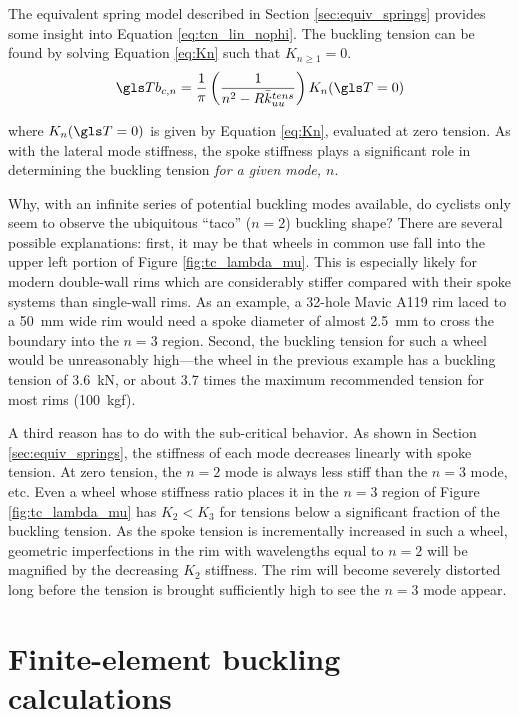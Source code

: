 \documentclass[\rootdir/thesis.tex]{subfiles}
\begin{document}
The equivalent spring model described in Section \ref{sec:equiv_springs} provides some insight into Equation \eqref{eq:tcn_lin_nophi}. The buckling tension can be found by solving Equation \eqref{eq:Kn} such that $K_{n\geq 1} = 0$.
\begin{equation}
\Tb_{c,n} = \frac{1}{\pi}\left(\frac{1}{n^2 - R\kuu^{tens}}\right) K_n(\T=0)
\end{equation}

where $K_n(\T=0)$ is given by Equation \eqref{eq:Kn}, evaluated at zero tension. As with the lateral mode stiffness, the spoke stiffness plays a significant role in determining the buckling tension \emph{for a given mode, $n$}.

Why, with an infinite series of potential buckling modes available, do cyclists only seem to observe the ubiquitous ``taco'' ($n=2$) buckling shape? There are several possible explanations: first, it may be that wheels in common use fall into the upper left portion of Figure \ref{fig:tc_lambda_mu}. This is especially likely for modern double-wall rims which are considerably stiffer compared with their spoke systems than single-wall rims. As an example, a 32-hole Mavic A119 rim laced to a \SI{50}{mm} wide rim would need a spoke diameter of almost \SI{2.5}{mm} to cross the boundary into the $n=3$ region. Second, the buckling tension for such a wheel would be unreasonably high---the wheel in the previous example has a buckling tension of \SI{3.6}{kN}, or about 3.7 times the maximum recommended tension for most rims (\SI{100}{kgf}).

A third reason has to do with the sub-critical behavior. As shown in Section \ref{sec:equiv_springs}, the stiffness of each mode decreases linearly with spoke tension. At zero tension, the $n=2$ mode is always less stiff than the $n=3$ mode, etc. Even a wheel whose stiffness ratio places it in the $n=3$ region of Figure \ref{fig:tc_lambda_mu} has $K_2<K_3$ for tensions below a significant fraction of the buckling tension. As the spoke tension is incrementally increased in such a wheel, geometric imperfections in the rim with wavelengths equal to $n=2$ will be magnified by the decreasing $K_2$ stiffness. The rim will become severely distorted long before the tension is brought sufficiently high to see the $n=3$ mode appear.


\section{Finite-element buckling calculations}
\end{document}
